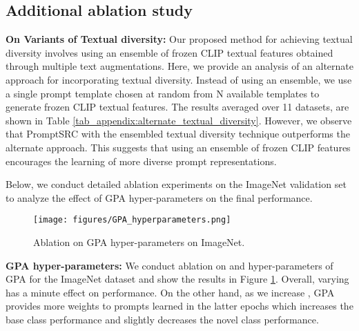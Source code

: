 \documentclass[10pt,twocolumn,letterpaper]{article}
\begin{document}
\begin{center}
\section{Additional ablation study}
\label{appendix:additional_ablation}
\noindent \textbf{On Variants of Textual diversity:} Our proposed method for achieving textual diversity involves using an ensemble of frozen CLIP textual features obtained through multiple text augmentations. Here, we provide an analysis of an alternate approach for incorporating textual diversity. Instead of using an ensemble, we use a single prompt template chosen at random from N available templates to generate frozen CLIP textual features. The results averaged over 11 datasets, are shown in Table \ref{tab_appendix:alternate_textual_diversity}. However, we observe that PromptSRC with the ensembled textual diversity technique outperforms the alternate approach. This suggests that using an ensemble of frozen CLIP features encourages the learning of more diverse prompt representations.

Below, we conduct detailed ablation experiments on the ImageNet validation set to analyze the effect of GPA hyper-parameters on the final performance.

\begin{figure}[!t]
    \centering
    \texttt{[image: figures/GPA\_hyperparameters.png]}
\caption{Ablation on GPA hyper-parameters on ImageNet.}
  \label{fig:gpa_hyperparameters}
\end{figure}

\noindent \textbf{GPA hyper-parameters:}
We conduct ablation on  and  hyper-parameters of GPA for the ImageNet dataset and show the results in Figure \ref{fig:gpa_hyperparameters}. Overall, varying  has a minute effect on performance. On the other hand, as we increase , GPA provides more weights to prompts learned in the latter epochs which increases the base class performance and slightly decreases the novel class performance.



\end{center}
\end{document}
